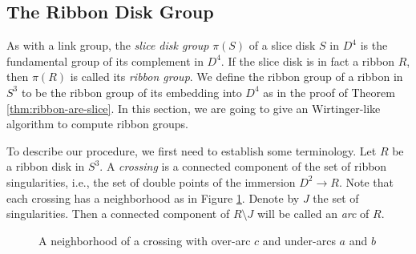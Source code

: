 \documentclass{article}
\theoremstyle{definition}
\begin{document}
\subsection{The Ribbon Disk Group}






As with a link group, the \textit{slice disk group} $\pi(S)$ of a slice disk $S$ in $D^4$ is the fundamental group of its complement in $D^4$. If the slice disk is in fact a ribbon $R$, then $\pi(R)$ is called its \textit{ribbon group}. We define the ribbon group of a ribbon in $S^3$ to be the ribbon group of its embedding into $D^4$ as in the proof of Theorem \ref{thm:ribbon-are-slice}. In this section, we are going to give an Wirtinger-like algorithm to compute ribbon groups.

To describe our procedure, we first need to establish some terminology. Let $R$ be a ribbon disk in $S^3$. A \textit{crossing} is a connected component of the set of ribbon singularities, i.e., the set of double points of the immersion $D^2 \rightarrow R$. Note that each crossing has a neighborhood as in Figure \ref{fig:nbhd-of-crossing-ribbon}. Denote by $J$ the set of singularities. Then a connected component of $R \setminus J$ will be called an \textit{arc} of $R$.

\begin{figure}[htb]
\centering
{}
\caption{A neighborhood of a crossing with over-arc $c$ and under-arcs $a$ and $b$}
\label{fig:nbhd-of-crossing-ribbon}
\end{figure}
\end{document}
